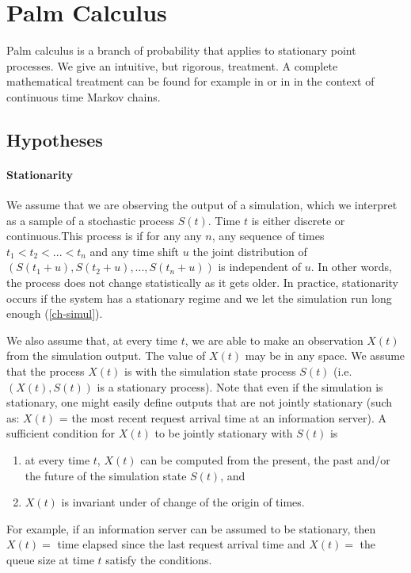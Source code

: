 \section{Palm Calculus}
\label{sec-palm}

Palm calculus is a branch of probability that applies to stationary
point processes. We give an intuitive, but rigorous, treatment. A
complete mathematical treatment can be found for example in
\cite{baccelli-87,robert-03} or in \cite{serfozo2009basics} in the context of continuous time Markov chains.

\subsection{Hypotheses}
\paragraph*{Stationarity}
We assume that we are observing the output of a simulation,
which we interpret as a sample of a stochastic process $S(t)$.
Time $t$ is either discrete or continuous.This process is
 if for any any $n$, any sequence of times
$t_1<t_2<...<t_n$ and any time shift $u$ the joint distribution
of $(S(t_1+u),S(t_2+u),...,S(t_n+u))$ is independent of $u$. In
other words, the process does not change statistically as it
gets older. In practice, stationarity occurs if the system has
a stationary regime and we let the simulation run long enough
(\cref{ch-simul}).

We also assume that, at every time $t$, we are able to make an
observation $X(t)$ from the simulation output. The value of
$X(t)$ may be in any space. We assume that the process $X(t)$
is  with the simulation state process
$S(t)$ (i.e. $(X(t), S(t))$ is a stationary process). Note that
even if the simulation is stationary, one might easily define
outputs that are not jointly stationary (such as: $X(t)$ = the
most recent request arrival time at an information server). A
sufficient condition for $X(t)$ to be jointly stationary with
$S(t)$ is\begin{enumerate}
    \item at every time $t$, $X(t)$ can be computed from the present,
    the
    past and/or the future of the simulation state $S(t)$, and
    \item $X(t)$ is invariant under of change of the origin of times.
\end{enumerate}
For example, if an information server can be assumed to be
stationary, then $X(t)=$ time elapsed since the last request arrival
time and $X(t)=$ the queue size at time $t$ satisfy the conditions.

